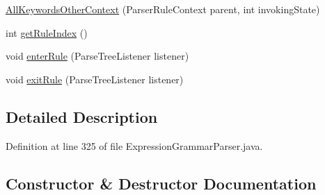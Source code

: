 \begin{DoxyCompactItemize}
\item 
\hyperlink{classgov_1_1nasa_1_1jpf_1_1inspector_1_1server_1_1expression_1_1parser_1_1_expression_grammar_pacb3381aaee949f84c436ba6b73657885_a782bdbb76181f16612d5ff98a858f331}{All\+Keywords\+Other\+Context} (Parser\+Rule\+Context parent, int invoking\+State)
\item 
int \hyperlink{classgov_1_1nasa_1_1jpf_1_1inspector_1_1server_1_1expression_1_1parser_1_1_expression_grammar_pacb3381aaee949f84c436ba6b73657885_a607cac8f0a040016e0dbf4d6fd3a8552}{get\+Rule\+Index} ()
\item 
void \hyperlink{classgov_1_1nasa_1_1jpf_1_1inspector_1_1server_1_1expression_1_1parser_1_1_expression_grammar_pacb3381aaee949f84c436ba6b73657885_a6bc72bab09d13eae9c7c54f8597fddad}{enter\+Rule} (Parse\+Tree\+Listener listener)
\item 
void \hyperlink{classgov_1_1nasa_1_1jpf_1_1inspector_1_1server_1_1expression_1_1parser_1_1_expression_grammar_pacb3381aaee949f84c436ba6b73657885_a8a50732eabdbf6c59e385b12828ff1bd}{exit\+Rule} (Parse\+Tree\+Listener listener)
\end{DoxyCompactItemize}


\subsection{Detailed Description}


Definition at line 325 of file Expression\+Grammar\+Parser.\+java.



\subsection{Constructor \& Destructor Documentation}
